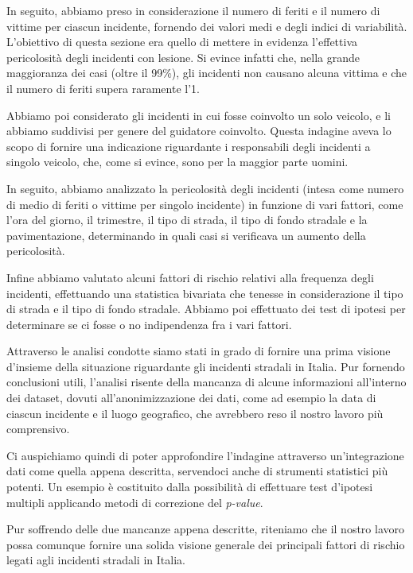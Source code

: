 \documentclass[12pt,a4paper,final,oneside]{article}			%
\begin{document}
    In seguito, abbiamo preso in considerazione il numero di feriti e il numero di vittime per ciascun incidente, fornendo dei valori medi e degli indici di variabilità. L’obiettivo di questa sezione era quello di mettere in evidenza l’effettiva pericolosità degli incidenti con lesione. Si evince infatti che, nella grande maggioranza dei casi (oltre il 99\%), gli incidenti non causano alcuna vittima e che il numero di feriti supera raramente l’1.
    
    Abbiamo poi considerato gli incidenti in cui fosse coinvolto un solo veicolo, e li abbiamo suddivisi per genere del guidatore coinvolto. 
    Questa indagine aveva lo scopo di fornire una indicazione riguardante i responsabili degli incidenti a singolo veicolo, che, come si evince, sono per la maggior parte uomini.
    
    In seguito, abbiamo analizzato la pericolosità degli incidenti (intesa come numero di medio di feriti o vittime per singolo incidente) in funzione di vari fattori, come l’ora del giorno, il trimestre, il tipo di strada, il tipo di fondo stradale e la pavimentazione, determinando in quali casi si verificava un aumento della pericolosità. 
    
    Infine abbiamo valutato alcuni fattori di rischio relativi alla frequenza degli incidenti, effettuando una statistica bivariata che tenesse in considerazione il tipo di strada e il tipo di fondo stradale.
    Abbiamo poi effettuato dei test di ipotesi per determinare se ci fosse o no indipendenza fra i vari fattori.
    
    Attraverso le analisi condotte siamo stati in grado di fornire una prima visione d’insieme della situazione riguardante gli incidenti stradali in Italia. 
    Pur fornendo conclusioni utili, l’analisi risente della mancanza di alcune informazioni all’interno dei dataset, dovuti all’anonimizzazione dei dati, come ad esempio la data di ciascun incidente e il luogo geografico, che avrebbero reso il nostro lavoro più comprensivo.
    
    Ci auspichiamo quindi di poter approfondire l’indagine attraverso un’integrazione dati come quella appena descritta, servendoci anche di strumenti statistici più potenti. 
    Un esempio è costituito dalla possibilità di effettuare test d’ipotesi multipli applicando metodi di correzione del \textit{p-value}. 
    
    Pur soffrendo delle due mancanze appena descritte, riteniamo che il nostro lavoro possa comunque fornire una solida visione generale dei principali fattori di rischio legati agli incidenti stradali in Italia.
\end{document}

